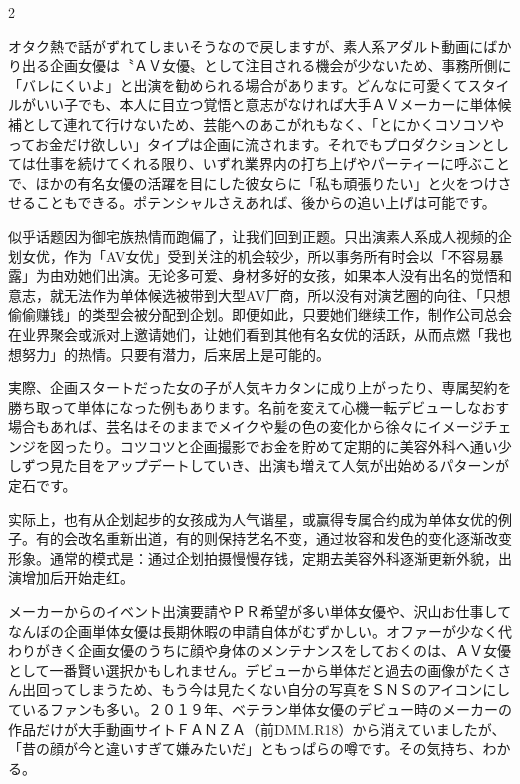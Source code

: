 \documentclass[12pt,UTF8]{ctexbook}
\begin{document}
\begin{paracol}{2}
\switchcolumn*

オタク熱で話がずれてしまいそうなので戻しますが、素人系アダルト動画にばかり出る企画女優は〝ＡＶ女優〟として注目される機会が少ないため、事務所側に「バレにくいよ」と出演を勧められる場合があります。どんなに可愛くてスタイルがいい子でも、本人に目立つ覚悟と意志がなければ大手ＡＶメーカーに単体候補として連れて行けないため、芸能へのあこがれもなく、「とにかくコソコソやってお金だけ欲しい」タイプは企画に流されます。それでもプロダクションとしては仕事を続けてくれる限り、いずれ業界内の打ち上げやパーティーに呼ぶことで、ほかの有名女優の活躍を目にした彼女らに「私も頑張りたい」と火をつけさせることもできる。ポテンシャルさえあれば、後からの追い上げは可能です。

\switchcolumn

似乎话题因为御宅族热情而跑偏了，让我们回到正题。只出演素人系成人视频的企划女优，作为「AV女优」受到关注的机会较少，所以事务所有时会以「不容易暴露」为由劝她们出演。无论多可爱、身材多好的女孩，如果本人没有出名的觉悟和意志，就无法作为单体候选被带到大型AV厂商，所以没有对演艺圈的向往、「只想偷偷赚钱」的类型会被分配到企划。即便如此，只要她们继续工作，制作公司总会在业界聚会或派对上邀请她们，让她们看到其他有名女优的活跃，从而点燃「我也想努力」的热情。只要有潜力，后来居上是可能的。

\switchcolumn*

実際、企画スタートだった女の子が人気キカタンに成り上がったり、専属契約を勝ち取って単体になった例もあります。名前を変えて心機一転デビューしなおす場合もあれば、芸名はそのままでメイクや髪の色の変化から徐々にイメージチェンジを図ったり。コツコツと企画撮影でお金を貯めて定期的に美容外科へ通い少しずつ見た目をアップデートしていき、出演も増えて人気が出始めるパターンが定石です。

\switchcolumn

实际上，也有从企划起步的女孩成为人气谐星，或赢得专属合约成为单体女优的例子。有的会改名重新出道，有的则保持艺名不变，通过妆容和发色的变化逐渐改变形象。通常的模式是：通过企划拍摄慢慢存钱，定期去美容外科逐渐更新外貌，出演增加后开始走红。

\switchcolumn*

メーカーからのイベント出演要請やＰＲ希望が多い単体女優や、沢山お仕事してなんぼの企画単体女優は長期休暇の申請自体がむずかしい。オファーが少なく代わりがきく企画女優のうちに顔や身体のメンテナンスをしておくのは、ＡＶ女優として一番賢い選択かもしれません。デビューから単体だと過去の画像がたくさん出回ってしまうため、もう今は見たくない自分の写真をＳＮＳのアイコンにしているファンも多い。２０１９年、ベテラン単体女優のデビュー時のメーカーの作品だけが大手動画サイトＦＡＮＺＡ（前DMM.R18）から消えていましたが、「昔の顔が今と違いすぎて嫌みたいだ」ともっぱらの噂です。その気持ち、わかる。


\end{paracol}
\end{document}
